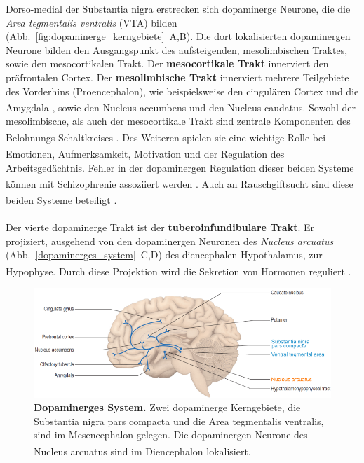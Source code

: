 \documentclass[12pt,a4paper,pdftex]{article}
\begin{document}
Dorso-medial der Substantia nigra erstrecken sich dopaminerge Neurone, die die \textit{Area tegmentalis ventralis} (VTA) bilden (Abb.~\ref{fig:dopaminerge_kerngebiete}~A,B). Die dort lokalisierten dopaminergen Neurone bilden den Ausgangspunkt des aufsteigenden, mesolimbischen Traktes, sowie den mesocortikalen Trakt. Der \textbf{mesocortikale Trakt} innerviert den präfrontalen Cortex. Der \textbf{mesolimbische Trakt} innerviert mehrere Teilgebiete des Vorderhins (Proencephalon), wie beispielsweise den cingulären Cortex und die Amygdala \textsuperscript{\cite[9]{crossman2014neuroanatomy}}, sowie den Nucleus accumbens und den Nucleus caudatus.
Sowohl der mesolimbische, als auch der mesocortikale Trakt sind zentrale Komponenten des Belohnungs-Schaltkreises \textsuperscript{\cite[49]{kandel2013principles}}.
Des Weiteren spielen sie eine wichtige Rolle bei Emotionen, Aufmerksamkeit, Motivation \textsuperscript{\cite[13]{kandel2013principles}} und der Regulation des Arbeitsgedächtnis. Fehler in der dopaminergen Regulation dieser beiden Systeme können mit Schizophrenie assoziiert werden \textsuperscript{\cite[67]{kandel2013principles}}.
Auch an Rauschgiftsucht sind diese beiden Systeme beteiligt \textsuperscript{\cite[13]{kandel2013principles}}.
\\
\\
Der vierte dopaminerge Trakt ist der \textbf{tuberoinfundibulare Trakt}. Er projiziert, ausgehend von den dopaminergen Neuronen des \textit{Nucleus arcuatus} (Abb.~\ref{dopaminerges_system}~C,D) des diencephalen Hypothalamus, zur Hypophyse. Durch diese Projektion wird die Sekretion von Hormonen reguliert \textsuperscript{\cite[13]{kandel2013principles}}.

\begin{figure}[H]
    \centering
    \includegraphics[width=\textwidth]{pictures/Bilder_monoamine_systeme/dopaminerges_system.PNG}
    \caption[Dopaminerges System]{\textbf{Dopaminerges System.} Zwei dopaminerge Kerngebiete, die Substantia nigra pars compacta und die Area tegmentalis ventralis, sind im Mesencephalon gelegen. Die dopaminergen Neurone des Nucleus arcuatus sind im Diencephalon lokalisiert. \textsuperscript{\cite[9]{crossman2014neuroanatomy}}}
    \label{fig:dopaminerges_system}
\end{figure}
\end{document}
